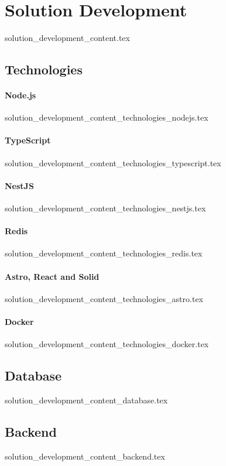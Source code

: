 \chapter{Solution Development}\label{sec:solution_development}
  {solution_development_content.tex}

\section{Technologies}\label{sub:technologies}
\subsubsection*{Node.js}
  {solution_development_content_technologies_nodejs.tex}
\subsubsection*{TypeScript}
  {solution_development_content_technologies_typescript.tex}
  \subsubsection*{NestJS}
  {solution_development_content_technologies_nestjs.tex}
\subsubsection*{Redis}\label{sub:redis}
  {solution_development_content_technologies_redis.tex}
\subsubsection*{Astro, React and Solid}\label{sub:astro}
  {solution_development_content_technologies_astro.tex}
\subsubsection*{Docker}\label{sub:docker}
  {solution_development_content_technologies_docker.tex}

\section{Database}
  {solution_development_content_database.tex}

\section{Backend}
  {solution_development_content_backend.tex}
